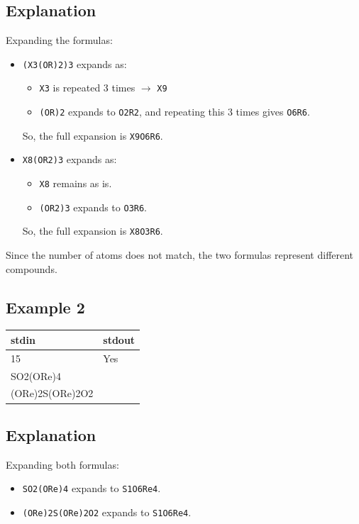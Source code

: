\documentclass[12pt,a4paper]{article}
\begin{document}
\subsection*{\fontsize{16}{12}Explanation}

Expanding the formulas:
\begin{itemize}
    \item \texttt{(X3(OR)2)3} expands as:
      \begin{itemize}
          \item \texttt{X3} is repeated 3 times $\rightarrow$ \texttt{X9}
          \item \texttt{(OR)2} expands to \texttt{O2R2}, and repeating this 3 times gives \texttt{O6R6}.
      \end{itemize}
      So, the full expansion is \texttt{X9O6R6}.
      
    \item \texttt{X8(OR2)3} expands as:
      \begin{itemize}
          \item \texttt{X8} remains as is.
          \item \texttt{(OR2)3} expands to \texttt{O3R6}.
      \end{itemize}
      So, the full expansion is \texttt{X8O3R6}.
\end{itemize}
\noindent
Since the number of atoms does not match, the two formulas represent different compounds.

\subsection*{\fontsize{16}{12}Example 2}
\begin{table}[h]
  \centering
  \begin{tabularx}{\textwidth}{|>{\ttfamily}X|>{\ttfamily}X|}
    \hline
    stdin & stdout \\
    \hline
    9 15 & Yes \\ 
    SO2(ORe)4 & \\
    (ORe)2S(ORe)2O2 & \\
    \hline
  \end{tabularx}
\end{table}

\subsection*{\fontsize{16}{12}Explanation}
Expanding both formulas:
\begin{itemize}
    \item \texttt{SO2(ORe)4} expands to \texttt{S1O6Re4}.
    \item \texttt{(ORe)2S(ORe)2O2} expands to \texttt{S1O6Re4}.
\end{itemize}
\end{document}
